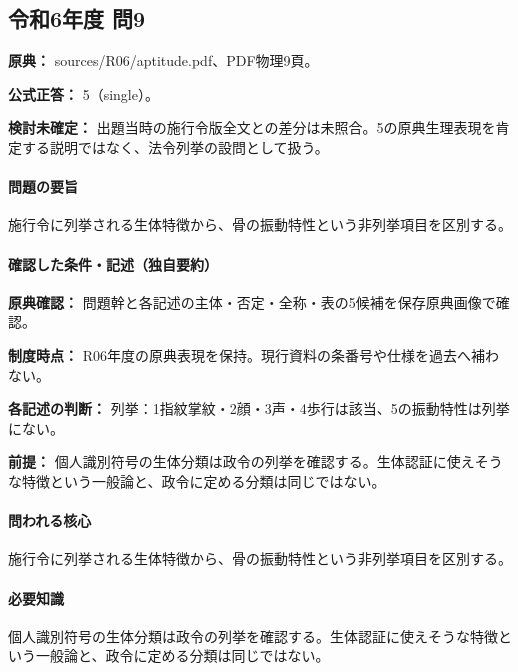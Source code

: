 \subsection{令和6年度 問9}
\label{q:r06-reg-apt-09}

\noindent\textbf{原典：} sources/R06/aptitude.pdf、PDF物理9頁。

\textbf{公式正答：} 5（single）。

\par\textbf{検討未確定：} 出題当時の施行令版全文との差分は未照合。5の原典生理表現を肯定する説明ではなく、法令列挙の設問として扱う。

\paragraph{問題の要旨} 施行令に列挙される生体特徴から、骨の振動特性という非列挙項目を区別する。

\paragraph{確認した条件・記述（独自要約）}\mbox{}\par

\noindent\textbf{原典確認：} 問題幹と各記述の主体・否定・全称・表の5候補を保存原典画像で確認。\par

\noindent\textbf{制度時点：} R06年度の原典表現を保持。現行資料の条番号や仕様を過去へ補わない。\par

\noindent\textbf{各記述の判断：} 列挙：1指紋掌紋・2顔・3声・4歩行は該当、5の振動特性は列挙にない。\par

\noindent\textbf{前提：} 個人識別符号の生体分類は政令の列挙を確認する。生体認証に使えそうな特徴という一般論と、政令に定める分類は同じではない。\par

\paragraph{問われる核心} 施行令に列挙される生体特徴から、骨の振動特性という非列挙項目を区別する。

\paragraph{必要知識} 個人識別符号の生体分類は政令の列挙を確認する。生体認証に使えそうな特徴という一般論と、政令に定める分類は同じではない。

